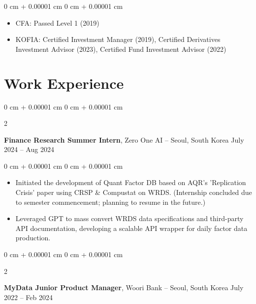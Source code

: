 \documentclass[10pt, letterpaper]{article}
\newenvironment{highlights}{
    \begin{itemize}[
        topsep=0.10 cm,
        parsep=0.10 cm,
        partopsep=0pt,
        itemsep=0pt,
        leftmargin=0 cm + 10pt
    ]
}{
    \end{itemize}
} %
\newenvironment{onecolentry}{
    \begin{adjustwidth}{
        0 cm + 0.00001 cm
    }{
        0 cm + 0.00001 cm
    }
}{
    \end{adjustwidth}
} %
\newenvironment{twocolentry}[2][]{
    \onecolentry
    \def\secondColumn{#2}
    \setcolumnwidth{\fill, 4.5 cm}
    \begin{paracol}{2}
}{
    \switchcolumn \raggedleft \secondColumn
    \end{paracol}
    \endonecolentry
} %
\begin{document}
        \vspace{0.10 cm}
        \begin{onecolentry}
            \begin{highlights}
                \item CFA: Passed Level 1 (2019)
                \item KOFIA: Certified Investment Manager (2019), Certified Derivatives Investment Advisor (2023), Certified Fund Investment Advisor (2022)
            \end{highlights}
        \end{onecolentry}



    
    \section{Work Experience}



        
        \begin{twocolentry}{
            July 2024 – Aug 2024
        }
            \textbf{Finance Research Summer Intern}, Zero One AI -- Seoul, South Korea\end{twocolentry}

        \vspace{0.10 cm}
        \begin{onecolentry}
            \begin{highlights}
                \item Initiated the development of Quant Factor DB based on AQR's 'Replication Crisis' paper using CRSP \& Compustat on WRDS. (Internship concluded due to semester commencement; planning to resume in the future.)
                \item Leveraged GPT to mass convert WRDS data specifications and third-party API documentation, developing a scalable API wrapper for daily factor data production.
            \end{highlights}
        \end{onecolentry}


        \vspace{0.2 cm}

        \begin{twocolentry}{
            July 2022 – Feb 2024
        }
            \textbf{MyData Junior Product Manager}, Woori Bank -- Seoul, South Korea\end{twocolentry}
\end{document}
